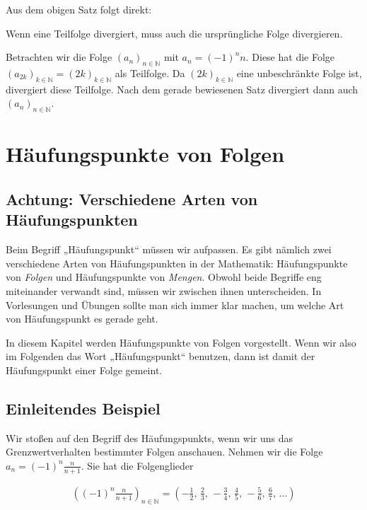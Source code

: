 \documentclass[fontsize=9pt,
               parskip=half-,
               DIV=14,
               listof=chapterentry,
               tocflat]{scrbook}
\begin{document}
Aus dem obigen Satz folgt direkt:

\begin{theorem*}
Wenn eine Teilfolge divergiert, muss auch die ursprüngliche Folge divergieren.

\end{theorem*}

\begin{example*}
Betrachten wir die Folge $(a_{n})_{n\in \mathbb {N} }$ mit $a_{n}=(-1)^{n}n$. Diese hat die Folge $(a_{2k})_{k\in \mathbb {N} }=(2k)_{k\in \mathbb {N} }$ als Teilfolge. Da $(2k)_{k\in \mathbb {N} }$ eine unbeschränkte Folge ist, divergiert diese Teilfolge. Nach dem gerade bewiesenen Satz divergiert dann auch $(a_{n})_{n\in \mathbb {N} }$.

\end{example*}

\chapter{Häufungspunkte von Folgen}

\section{Achtung: Verschiedene Arten von Häufungspunkten}

Beim Begriff „Häufungspunkt“ müssen wir aufpassen. Es gibt nämlich zwei verschiedene Arten von Häufungspunkten in der Mathematik: Häufungspunkte von \emph{Folgen} und Häufungspunkte von \emph{Mengen}. Obwohl beide Begriffe eng miteinander verwandt sind, müssen wir zwischen ihnen unterscheiden. In Vorlesungen und Übungen sollte man sich immer klar machen, um welche Art von Häufungspunkt es gerade geht.

In diesem Kapitel werden Häufungspunkte von Folgen vorgestellt. Wenn wir also im Folgenden das Wort „Häufungspunkt“ benutzen, dann ist damit der Häufungspunkt einer Folge gemeint.

\section{Einleitendes Beispiel}

Wir stoßen auf den Begriff des Häufungspunkts, wenn wir uns das Grenzwertverhalten bestimmter Folgen anschauen. Nehmen wir die Folge $a_{n}=(-1)^{n}{\tfrac {n}{n+1}}$. Sie hat die Folgenglieder

\begin{align*}
\left((-1)^{n}{\tfrac {n}{n+1}}\right)_{n\in \mathbb {N} }=\left(-{\tfrac {1}{2}},\,{\tfrac {2}{3}},\,-{\tfrac {3}{4}},\,{\tfrac {4}{5}},\,-{\tfrac {5}{6}},\,{\tfrac {6}{7}},\,\ldots \right)
\end{align*}
\end{document}
